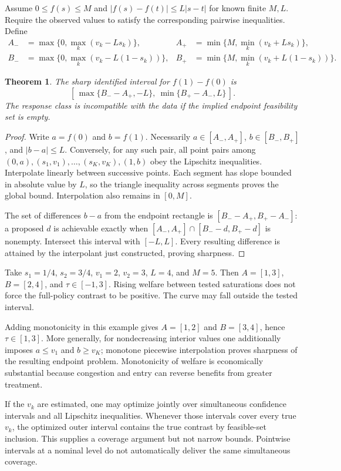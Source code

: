 \documentclass[11pt,a4paper]{article}
\newtheorem{theorem}{Theorem}[section]
\begin{document}
Assume $0\le f(s)\le M$ and $|f(s)-f(t)|\le L|s-t|$ for known finite $M,L$. Require the observed values to satisfy the corresponding pairwise inequalities. Define
\[
\begin{aligned}
 A_-&=\max\{0,\max_k(v_k-Ls_k)\},&
 A_+&=\min\{M,\min_k(v_k+Ls_k)\},\\
 B_-&=\max\{0,\max_k(v_k-L(1-s_k))\},&
 B_+&=\min\{M,\min_k(v_k+L(1-s_k))\}.
\end{aligned}
\tag{2}
\]
\begin{theorem}
The sharp identified interval for $f(1)-f(0)$ is
\[
 [\,\max\{B_--A_+,-L\},\ \min\{B_+-A_-,L\}\,].
 \tag{3}
\]
The response class is incompatible with the data if the implied endpoint feasibility set is empty.
\end{theorem}
\begin{proof}
Write $a=f(0)$ and $b=f(1)$. Necessarily $a\in[A_-,A_+]$, $b\in[B_-,B_+]$, and $|b-a|\le L$. Conversely, for any such pair, all point pairs among
$(0,a),(s_1,v_1),\ldots,(s_K,v_K),(1,b)$ obey the Lipschitz inequalities. Interpolate linearly between successive points. Each segment has slope bounded in absolute value by $L$, so the triangle inequality across segments proves the global bound. Interpolation also remains in $[0,M]$.

The set of differences $b-a$ from the endpoint rectangle is
$[B_--A_+,B_+-A_-]$: a proposed $d$ is achievable exactly when
$[A_-,A_+]\cap[B_--d,B_+-d]$ is nonempty. Intersect this interval with $[-L,L]$. Every resulting difference is attained by the interpolant just constructed, proving sharpness.
\end{proof}
Take $s_1=1/4$, $s_2=3/4$, $v_1=2$, $v_2=3$, $L=4$, and $M=5$. Then $A=[1,3]$, $B=[2,4]$, and $\tau\in[-1,3]$. Rising welfare between tested saturations does not force the full-policy contrast to be positive. The curve may fall outside the tested interval.

Adding monotonicity in this example gives $A=[1,2]$ and $B=[3,4]$, hence $\tau\in[1,3]$. More generally, for nondecreasing interior values one additionally imposes $a\le v_1$ and $b\ge v_K$; monotone piecewise interpolation proves sharpness of the resulting endpoint problem. Monotonicity of welfare is economically substantial because congestion and entry can reverse benefits from greater treatment.

If the $v_k$ are estimated, one may optimize jointly over simultaneous confidence intervals and all Lipschitz inequalities. Whenever those intervals cover every true $v_k$, the optimized outer interval contains the true contrast by feasible-set inclusion. This supplies a coverage argument but not narrow bounds. Pointwise intervals at a nominal level do not automatically deliver the same simultaneous coverage.
\end{document}
